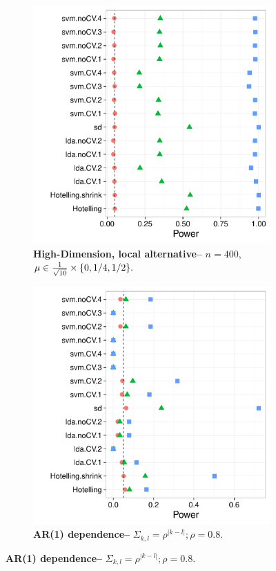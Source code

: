 \documentclass[12pt,a4paper]{article}
\begin{document}
\begin{figure}[h]
\centering
\caption{\mycaption}	
	\begin{subfigure}{.4\textwidth}
	  \centering
	  \includegraphics[width=1\linewidth]{"art/2016-08-11 08:32:39"}
	  \caption{\textbf{High-Dimension, local alternative--} $n=400$, $\mu \in \frac{1}{\sqrt{10}} \times \{ 0,1/4,1/2 \}.$} 
	\label{fig:large_sample_3}
	\end{subfigure}
		\begin{subfigure}{.4\textwidth}
		  \centering
		  \includegraphics[width=1\linewidth]{"art/2016-08-07 20:11:46"}
		  \caption{\textbf{AR(1) dependence--} $\Sigma_{k,l}=\rho^{|k-l|}; \rho=0.8$. } 
		\label{fig:ar_1}
	\end{subfigure}
\end{figure}
\end{document}
